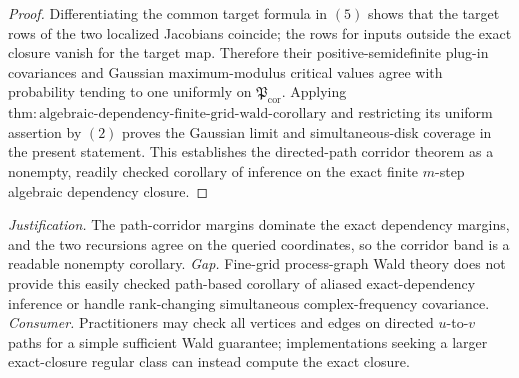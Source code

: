 \documentclass{article}
\begin{document}
\begin{proof}
Differentiating the common target formula in \((5)\) shows that the target rows of the two localized Jacobians coincide; the rows for inputs outside the exact closure vanish for the target map.  Therefore their positive-semidefinite plug-in covariances and Gaussian maximum-modulus critical values agree with probability tending to one uniformly on \(\mathfrak P_{\mathrm{cor}}\).  Applying \(\mathrm{thm{:}algebraic\mbox{-}dependency\mbox{-}finite\mbox{-}grid\mbox{-}wald\mbox{-}corollary}\) and restricting its uniform assertion by \((2)\) proves the Gaussian limit and simultaneous-disk coverage in the present statement.  This establishes the directed-path corridor theorem as a nonempty, readily checked corollary of inference on the exact finite \(m\)-step algebraic dependency closure.
\end{proof}
\par\smallskip\noindent \textit{Justification.} The path-corridor margins dominate the exact dependency margins, and the two recursions agree on the queried coordinates, so the corridor band is a readable nonempty corollary. \textit{Gap.} Fine-grid process-graph Wald theory does not provide this easily checked path-based corollary of aliased exact-dependency inference or handle rank-changing simultaneous complex-frequency covariance. \textit{Consumer.} Practitioners may check all vertices and edges on directed \(u\)-to-\(v\) paths for a simple sufficient Wald guarantee; implementations seeking a larger exact-closure regular class can instead compute the exact closure.
\end{document}
